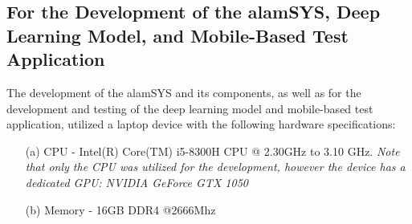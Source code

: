 \subsection{For the Development of the alamSYS, Deep Learning Model, and Mobile-Based Test Application}
\label{subsec:alamSYS_hardware}
The development of the alamSYS and its components, as well as for the development
and testing of the deep learning model and mobile-based test application, utilized a laptop device with the
following hardware specifications:
\begin{itemize}
    \item[(a)] CPU - Intel(R) Core(TM) i5-8300H CPU @ 2.30GHz to 3.10 GHz.
    \textit{Note that only the CPU was utilized for the development, however the
    device has a dedicated GPU: NVIDIA GeForce GTX 1050}
    \item[(b)] Memory - 16GB DDR4 @2666Mhz
\end{itemize}